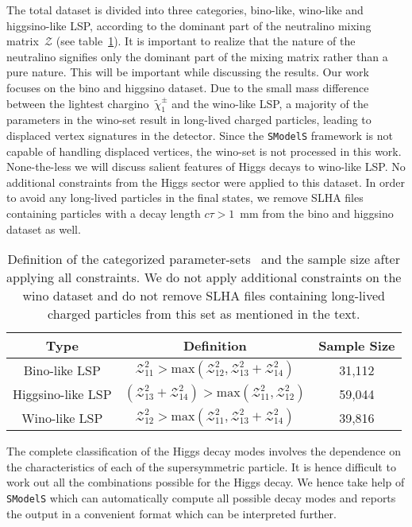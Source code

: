 \documentclass[11pt,a4paper]{article}
\begin{document}
The total dataset is divided into three categories, bino-like, wino-like and higgsino-like LSP,  according to the dominant part of the neutralino mixing matrix~$\mathcal{Z}$ (see table~\ref{tab_category}). It is important to realize that the nature of the neutralino signifies only the dominant part of the mixing matrix rather than a pure nature. This will be important while discussing the results. Our work focuses on the bino and higgsino dataset. Due to the small mass difference between the lightest chargino~$\tilde{\chi}_1^\pm$ and the wino-like LSP, a majority of the parameters in the wino-set result in long-lived charged particles, leading to displaced vertex signatures in the detector. Since the \texttt{SModelS} framework is not capable of handling displaced vertices, the wino-set is not processed in this work. None-the-less we will discuss salient features of Higgs decays to wino-like LSP. No additional constraints from the Higgs sector were applied to this dataset. In order to avoid any long-lived particles in the final states, we remove SLHA files containing particles with a decay length $c\tau>1$~mm from the bino and higgsino dataset as well.

\begin{table}[h]
\setlength\extrarowheight{5pt}
\centering
\begin{footnotesize}
\begin{tabular}{c c c}
\hline
\hline
\textbf{Type} & \textbf{Definition} & \textbf{Sample Size}\\[0.8ex]
\hline
Bino-like LSP & $\mathcal{Z}_{11}^2 > \text{max}(\mathcal{Z}_{12}^2, \mathcal{Z}_{13}^2 + \mathcal{Z}_{14}^2)$ & 31,112\\
Higgsino-like LSP & $(\mathcal{Z}_{13}^2 + \mathcal{Z}_{14}^2) > \text{max}(\mathcal{Z}_{11}^2, \mathcal{Z}_{12}^2)$ & 59,044\\
Wino-like LSP & $\mathcal{Z}_{12}^2 > \text{max}(\mathcal{Z}_{11}^2, \mathcal{Z}_{13}^2 + \mathcal{Z}_{14}^2)$ & 39,816\\[0.8ex]
\hline
\hline
\end{tabular}
\end{footnotesize}
\caption{Definition of the categorized parameter-sets~\cite{Aad:2015baa} and the sample size after applying all constraints. We do not apply additional constraints on the wino dataset and do not remove SLHA files containing long-lived charged particles from this set as mentioned in the text.}\label{tab_category}
\end{table}

The complete classification of the Higgs decay modes involves the dependence on the characteristics of each of the supersymmetric particle. It is hence difficult to work out all the combinations possible for the Higgs decay. We hence take help of \texttt{SModelS} which can automatically compute all possible decay modes and reports the output in a convenient format which can be interpreted further. 
%
\end{document}
